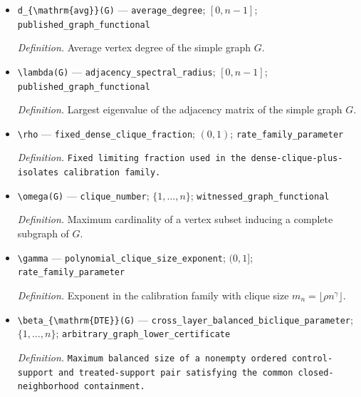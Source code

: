 \documentclass{article}
\begin{document}
\begin{itemize}
  \par\smallskip\noindent\emph{Definition.} Maximum cardinality of an independent vertex set in \(G\).
  \item \texttt{d\_\allowbreak{}\{\textbackslash{}\allowbreak{}mathrm\{avg\}\allowbreak{}\}\allowbreak{}(G)} --- \texttt{average\_\allowbreak{}degree}; \([0,n-1]\); \texttt{published\_\allowbreak{}graph\_\allowbreak{}functional}
  \par\smallskip\noindent\emph{Definition.} Average vertex degree of the simple graph \(G\).
  \item \texttt{\textbackslash{}\allowbreak{}lambda(G)} --- \texttt{adjacency\_\allowbreak{}spectral\_\allowbreak{}radius}; \([0,n-1]\); \texttt{published\_\allowbreak{}graph\_\allowbreak{}functional}
  \par\smallskip\noindent\emph{Definition.} Largest eigenvalue of the adjacency matrix of the simple graph \(G\).
  \item \texttt{\textbackslash{}\allowbreak{}rho} --- \texttt{fixed\_\allowbreak{}dense\_\allowbreak{}clique\_\allowbreak{}fraction}; \((0,1)\); \texttt{rate\_\allowbreak{}family\_\allowbreak{}parameter}
  \par\smallskip\noindent\emph{Definition.} \texttt{Fixed limiting fraction used in the dense-\allowbreak{}clique-\allowbreak{}plus-\allowbreak{}isolates calibration family.}
  \item \texttt{\textbackslash{}\allowbreak{}omega(G)} --- \texttt{clique\_\allowbreak{}number}; \(\{1,\ldots,n\}\); \texttt{witnessed\_\allowbreak{}graph\_\allowbreak{}functional}
  \par\smallskip\noindent\emph{Definition.} Maximum cardinality of a vertex subset inducing a complete subgraph of \(G\).
  \item \texttt{\textbackslash{}\allowbreak{}gamma} --- \texttt{polynomial\_\allowbreak{}clique\_\allowbreak{}size\_\allowbreak{}exponent}; \((0,1]\); \texttt{rate\_\allowbreak{}family\_\allowbreak{}parameter}
  \par\smallskip\noindent\emph{Definition.} Exponent in the calibration family with clique size \(m_n=\lfloor\rho n^{\gamma}\rfloor\).
  \item \texttt{\textbackslash{}\allowbreak{}beta\_\allowbreak{}\{\textbackslash{}\allowbreak{}mathrm\{DTE\}\allowbreak{}\}\allowbreak{}(G)} --- \texttt{cross\_\allowbreak{}layer\_\allowbreak{}balanced\_\allowbreak{}biclique\_\allowbreak{}parameter}; \(\{1,\ldots,n\}\); \texttt{arbitrary\_\allowbreak{}graph\_\allowbreak{}lower\_\allowbreak{}certificate}
  \par\smallskip\noindent\emph{Definition.} \texttt{Maximum balanced size of a nonempty ordered control-\allowbreak{}support and treated-\allowbreak{}support pair satisfying the common closed-\allowbreak{}neighborhood containment.}
\end{itemize}
\end{document}
